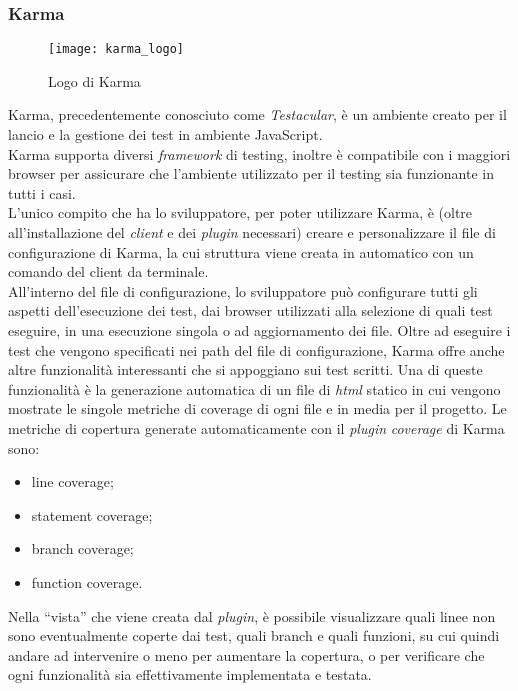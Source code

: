 \subsubsection{Karma}
\begin{figure}[htb] 
    \centering 
    \texttt{[image: karma\_logo]} 
    \caption{Logo di Karma}
\end{figure}
Karma, precedentemente conosciuto come \emph{Testacular}, è un ambiente creato per il lancio e la gestione dei test in ambiente JavaScript.\\
Karma supporta diversi \emph{framework} di testing, inoltre è compatibile con i maggiori browser per assicurare che l’ambiente utilizzato per il testing sia funzionante in tutti i casi.\\
L’unico compito che ha lo sviluppatore, per poter utilizzare Karma, è (oltre all’installazione del \emph{client} e dei \emph{plugin} necessari) creare e personalizzare il file di configurazione di Karma, la cui struttura viene creata in automatico con un comando del client da terminale.\\
All’interno del file di configurazione, lo sviluppatore può configurare tutti gli aspetti dell’esecuzione dei test, dai browser utilizzati alla selezione di quali test eseguire, in una esecuzione singola o ad aggiornamento dei file. 
Oltre ad eseguire i test che vengono specificati nei path del file di configurazione, Karma offre anche altre funzionalità interessanti che si appoggiano sui test scritti. Una di queste funzionalità è la generazione automatica di un file di \emph{html} statico in cui vengono mostrate le singole metriche di coverage di ogni file e in media per il progetto. Le metriche di copertura generate automaticamente con il \emph{plugin} \emph{coverage} di Karma sono:
\begin{itemize}
	\item line coverage;
	\item statement coverage;
	\item branch coverage;
	\item function coverage.
\end{itemize}
Nella “vista” che viene creata dal \emph{plugin}, è possibile visualizzare quali linee non sono eventualmente coperte dai test, quali branch e quali funzioni, su cui quindi andare ad intervenire o meno per aumentare la copertura, o per verificare che ogni funzionalità sia effettivamente implementata e testata.

